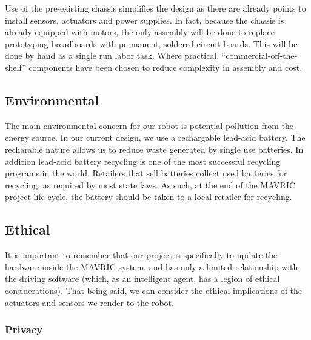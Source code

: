 \documentclass{article}
\begin{document}
            Use of the pre-existing chassis simplifies the design
            as there are already points to install sensors, actuators and power supplies.
            In fact, because the chassis is already equipped with motors,
            the only assembly will be done to replace prototyping breadboards 
            with permanent, soldered circuit boards.
            This will be done by hand as a single run labor task.
            Where practical, ``commercial-off-the-shelf'' components have been chosen
            to reduce complexity in assembly and cost.
        
        \subsection{Environmental}
        
            The main environmental concern for our robot is potential pollution
            from the energy source. 
            In our current design, we use a rechargable lead-acid battery.
            The recharable nature allows us to reduce waste generated by single use batteries.
            In addition lead-acid battery recycling
            is one of the most successful recycling programs in the world.
            Retailers that sell batteries collect used batteries for recycling,
            as required by most state laws.
            As such, at the end of the MAVRIC project life cycle,
            the battery should be taken to a local retailer for recycling.
    
        \subsection{Ethical}
        
            It is important to remember that our project is specifically
            to update the hardware inside the MAVRIC system,
            and has only a limited relationship with the driving software
            (which, as an intelligent agent, has a legion of ethical considerations).
            That being said, 
            we can consider the ethical implications of the actuators and sensors
            we render to the robot.
            
                \subsubsection{Privacy}
                
\end{document}
